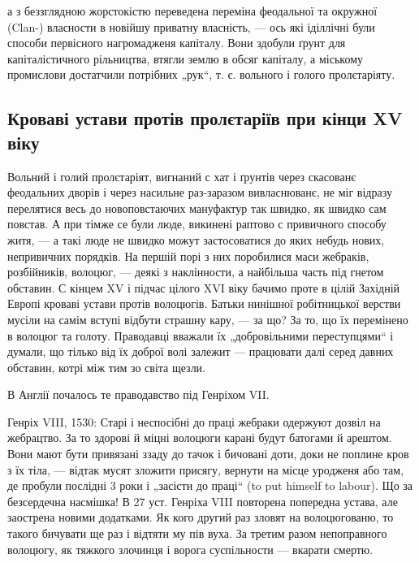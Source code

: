 \parcont{}
а з беззглядною жорстокістю переведена переміна феодальної та окружної (Clan-)
власности в новійшу приватну власність, — ось які іділлічні були способи
первісного нагромадженя капіталу. Вони здобули ґрунт для капіталістичного
рільництва, втягли землю в обсяг капіталу, а міському промислови
достатчили потрібних „рук“, т. є. вольного і голого пролєтаріяту.

\subsection{Кроваві устави протів пролєтаріїв при кінци XV віку}

Вольний і голий пролєтаріят, вигнаний с хат і ґрунтів
через скасованє феодальних дворів і через насильне раз-заразом
вивласнюванє, не міг відразу перелятися весь до
новоповстаючих мануфактур так швидко, як швидко сам
повстав. А при тімже се були люде, викинені раптово с привичного
способу житя, — а такі люде не швидко можут
застосоватися до яких небудь нових, непривичних порядків.
На першій порі з них поробилися маси жебраків, розбійників,
волоцюг, — деякі з наклінности, а найбільша часть під гнетом обставин. С
кінцем XV і підчас цілого XVI віку бачимо проте в цілій Західній Европі
кроваві устави протів волоцюгів. Батьки нинішної робітницької верстви мусіли
на самім вступі відбути страшну кару, — за що? За то, що їх перемінено в волоцюг
та голоту. Праводавці вважали їх „добровільними переступцями“ і думали, що
тілько від їх доброї волі залежит — працювати далі серед давних обставин, котрі
між тим зо світа щезли.

В Англії почалось те праводавство під Генріхом VII.

Генріх VIII, 1530: Старі і неспосібні до праці жебраки одержуют дозвіл на
жебрацтво. За то здорові й міцні волоцюги карані будут батогами й арештом. Вони
мают бути привязані ззаду до тачок і бичовані доти, доки не поплине кров з їх
тіла, — відтак мусят зложити присягу, вернути на місце уродженя або там, де
пробули послідні 3 роки  і „засісти до праці“ (to put himself to labour). Що за
безсердечна насмішка! В 27 уст. Генріха VIII повторена попередна устава, але
заострена новими додатками. Як кого другий раз зловят на волоцюгованю, то такого
бичувати ще раз і відтяти му пів вуха. За третим разом непоправного волоцюгу,
як тяжкого злочинця і ворога суспільности — вкарати смертю.

